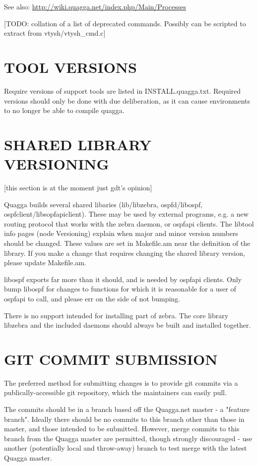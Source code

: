 \documentclass[oneside]{article}
\begin{document}
See also: \url{http://wiki.quagga.net/index.php/Main/Processes}

[TODO: collation of a list of deprecated commands. Possibly can be scripted
to extract from vtysh/vtysh\_cmd.c]


\section{TOOL VERSIONS}

Require versions of support tools are listed in INSTALL.quagga.txt.
Required versions should only be done with due deliberation, as it can
cause environments to no longer be able to compile quagga.


\section{SHARED LIBRARY VERSIONING}
\label{sec:dll-versioning}

[this section is at the moment just gdt's opinion]

Quagga builds several shared libaries (lib/libzebra, ospfd/libospf, 
ospfclient/libsopfapiclient).  These may be used by external programs,
e.g. a new routing protocol that works with the zebra daemon, or
ospfapi clients.  The libtool info pages (node Versioning) explain
when major and minor version numbers should be changed.  These values
are set in Makefile.am near the definition of the library.  If you
make a change that requires changing the shared library version,
please update Makefile.am.

libospf exports far more than it should, and is needed by ospfapi
clients.  Only bump libospf for changes to functions for which it is
reasonable for a user of ospfapi to call, and please err on the side
of not bumping.

There is no support intended for installing part of zebra.  The core
library libzebra and the included daemons should always be built and
installed together.


\section{GIT COMMIT SUBMISSION}
\label{sec:git-submission}

The preferred method for submitting changes is to provide git commits via a
publically-accessible git repository, which the maintainers can easily pull.

The commits should be in a branch based off the Quagga.net master - a
"feature branch".  Ideally there should be no commits to this branch other
than those in master, and those intended to be submitted.  However, merge
commits to this branch from the Quagga master are permitted, though strongly
discouraged - use another (potentially local and throw-away) branch to test
merge with the latest Quagga master.
\end{document}
